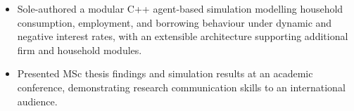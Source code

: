 \documentclass[6pt, letterpaper]{article}
\newenvironment{highlights}{
    \begin{itemize}[
        topsep=0.03 cm,
        parsep=0.03 cm,
        partopsep=0pt,
        itemsep=0pt,
        leftmargin=0 cm + 10pt
    ]
}{
    \end{itemize}
} %
\begin{document}
            \begin{highlights}

            \item Sole-authored a modular C++ agent-based simulation modelling household consumption, employment, and borrowing behaviour under dynamic and negative interest rates, with an extensible architecture supporting additional firm and household modules.
            \item Presented MSc thesis findings and simulation results at an academic conference, demonstrating research communication skills to an international audience.

            \end{highlights}
\end{document}
